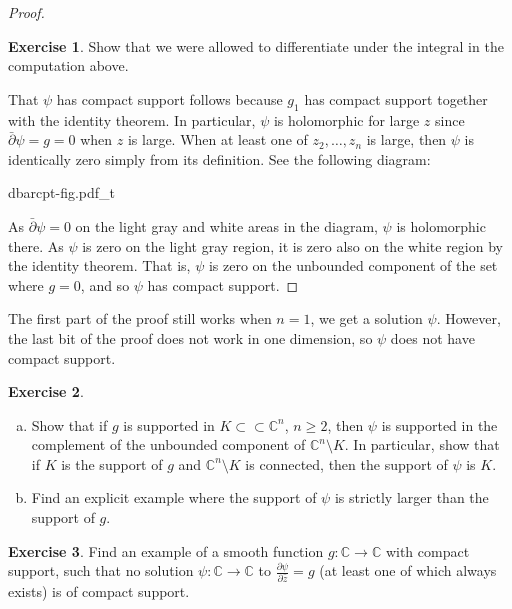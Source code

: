 \documentclass[12pt,openany]{book}
\newcommand{\C}{{\mathbb{C}}}
\theoremstyle{plain}
\theoremstyle{remark}
\theoremstyle{definition}
\newenvironment{exbox}{%
    \def\FrameCommand{\vrule width 1pt \relax\hspace{10pt}}%
    \MakeFramed {\advance \hsize -\width \FrameRestore}%
}{%
    \endMakeFramed
}
\newenvironment{exparts}{%
    \leavevmode\begin{enumerate}[a),noitemsep,topsep=0pt,parsep=0pt,partopsep=0pt]
}{%
    \end{enumerate}
}
\newenvironment{myfig}{%
    \begin{center}
}{%
    \end{center}
}
\theoremstyle{exercise}
\newtheorem{exercise}{Exercise}[section]
\theoremstyle{example}
\begin{document}
\begin{proof}
\begin{exbox}
\begin{exercise}
Show that we were allowed to differentiate under the integral in the
computation above.
\end{exercise}
\end{exbox}

That $\psi$ has compact support follows because $g_1$ has compact
support together with the identity theorem.  In particular, $\psi$ is
holomorphic for large $z$ since $\bar{\partial} \psi = g = 0$ when $z$
is large.  When at least one of $z_2,\ldots,z_n$ is large,
then $\psi$ is identically zero
simply from its definition.  See the following diagram:

\begin{myfig}
{dbarcpt-fig.pdf_t}
\end{myfig}

As $\bar{\partial} \psi = 0$ on the light gray and white areas in the
diagram, $\psi$ is holomorphic there. As $\psi$ is zero on the light
gray region, it is zero also on the white region by the identity theorem.
That is, $\psi$ is zero on the unbounded component of the set where $g=0$,
and so $\psi$ has compact support.
\end{proof}

The first part of the proof still works when $n=1$, we get a solution
$\psi$.  However, the last bit of the proof does not work in one dimension, so
$\psi$ does not have compact support.

\begin{exbox}
\begin{exercise} \label{exercise:supportofpsi}
\begin{exparts}
\item
Show that if $g$ is supported in $K \subset \subset \C^n$, $n \geq 2$,
then $\psi$ is supported in the complement of the unbounded component
of $\C^n \setminus K$.  In particular, show that if $K$ is the support of
$g$ and $\C^n \setminus K$ is connected, then the support of
$\psi$ is $K$.
\item
Find an explicit example where the support of $\psi$ is strictly larger
than the support of $g$.
\end{exparts}
\end{exercise}

\begin{exercise}
Find an example of a smooth function $g \colon \C \to \C$ with compact
support, such that no solution $\psi \colon \C \to \C$ to
$\frac{\partial \psi}{\partial \bar{z}} = g$ (at least one of which always exists) is
of compact support.
\end{exercise}
\end{exbox}
\end{document}
